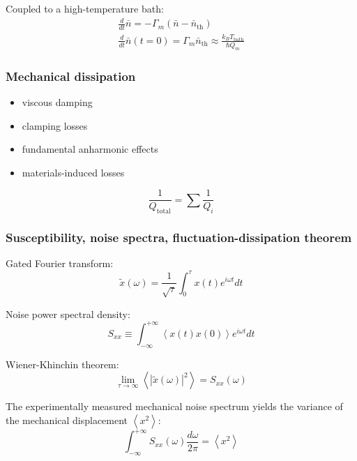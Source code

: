 \documentclass[8pt,a4paper,twocolumn]{article} %
\numberwithin{equation}{section} %
\begin{document}
			Coupled to a high-temperature bath:
				\begin{gather}
					\frac{d}{dt}\bar n = -\Gamma_m (\bar n-\bar n_{\text{th}})\\
					\frac{d}{dt}\bar n(t=0) = \Gamma_m \bar n_{\text{th}}\approx \frac{k_B T_{\text{bath}} }{\hbar Q_m}
				\end{gather}

			\subsubsection{Mechanical dissipation} %
			\label{ssub:mechanical_dissipation}
				
				\begin{itemize}
					\item viscous damping
					\item clamping losses
					\item fundamental anharmonic effects
					\item materials-induced losses
				\end{itemize}
				\begin{equation}
					\frac{1}{Q_{\text{total}}}=\sum \frac{1}{Q_i}
				\end{equation}

			\subsubsection{Susceptibility, noise spectra, fluctuation-dissipation theorem} %
			\label{ssub:susceptibility_noise_spectra_fluctuation_dissipation_theorem}
				Gated Fourier transform:
				\begin{equation}
					\tilde x(\omega)=\frac{1}{\sqrt \tau} \int_0^ \tau x(t)e^{i \omega t }dt
				\end{equation}

				Noise power spectral density:
				\begin{equation}
					S_{xx}\equiv \int_{-\infty}^{+\infty} \left< x(t)x(0) \right> e^{i \omega t}dt
				\end{equation}

				Wiener-Khinchin theorem:
				\begin{equation}
					\lim_{\tau\rightarrow \infty} \left<\left|\tilde x(\omega) \right|^2\right>=S_{xx}(\omega)
				\end{equation}

				The experimentally measured mechanical noise spectrum yields the variance of the mechanical displacement $\left< x^2\right>$:
				\begin{equation}
					\int_{-\infty}^{+\infty} S_{xx}(\omega)\frac{d \omega}{2 \pi}=\left< x^2\right>
				\end{equation}
\end{document}
